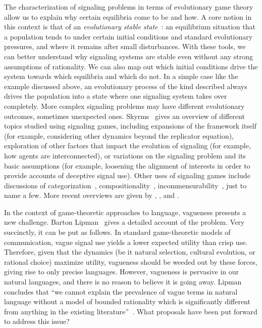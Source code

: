 \documentclass[a4paper]{article}
\begin{document}
The characterization of signaling problems in terms of evolutionary game theory allow us to explain why certain equilibria come to be and how.
A core notion in this context is that of an \emph{evolutionary stable state}~\parencite{maynard_smith_evolution_1982}: an equilibrium situation that a population tends to under certain initial conditions and standard evolutionary pressures, and where it remains after small disturbances.
With these tools, we can better understand why signaling systems are stable even without any strong assumptions of rationality.
We can also map out which initial conditions drive the system towards which equilibria and which do not.
In a simple case like the example discussed above, an evolutionary process of the kind described always drives the population into a state where one signaling system takes over completely. %
More complex signaling problems may have different evolutionary outcomes, sometimes unexpected ones.
Skyrms~\parencite*{skyrms_signals_2010} gives an overview of different topics studied using signaling games, including expansions of the framework itself (for example, considering other dynamics beyond the replicator equation), exploration of other factors that impact the evolution of signaling (for example, how agents are interconnected), or variations on the signaling problem and its basic assumptions (for example, loosening the alignment of interests in order to provide accounts of deceptive signal use).
Other uses of signaling games include discussions of categorization~\parencite[\emph{e.g.}][]{jager_language_2007}, compositionality~\parencite[\emph{e.g.}][]{barrett_evolution_2009}, incommensurability~\parencite[\emph{e.g.}][]{barrett_faithful_2010}, just to name a few.
More recent overviews are given by \textcites{huttegger_how_2014}, \textcite{huttegger_dynamics_2014}, and \citet{FrankeWagner2014:Game-Theory-and}.

In the context of game-theoretic approaches to language, vagueness presents a new challenge.
Barton Lipman~\parencite*{lipman_why_2009} gives a detailed account of the problem.
Very succinctly, it can be put as follows.
In standard game-theoretic models of communication, vague signal use yields a lower expected utility than crisp use.
Therefore, given that the dynamics (be it natural selection, cultural evolution, or rational choice) maximize utility, vagueness should be weeded out by these forces, giving rise to only precise languages.
However, vagueness is pervasive in our natural languages, and there is no reason to believe it is going away.
Lipman concludes that ``we cannot explain the prevalence of vague terms in natural language without a model of bounded rationality which is significantly different from anything in the existing literature''~\parencite*[1]{lipman_why_2009}.
What proposals have been put forward to address this issue?
\end{document}
